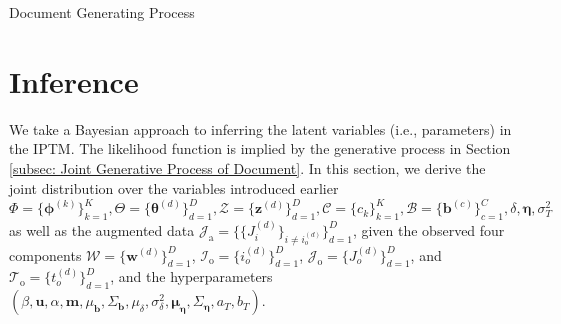 	\begin{algorithm}[H]
		\SetAlgoLined
		\caption{Document Generating Process}
	\label{alg:generative}
	\end{algorithm}

\section{Inference} \label{sec: Inference}		
We take a Bayesian approach to inferring the latent variables (i.e., parameters) in the IPTM. The likelihood function is implied by the generative process in Section \ref{subsec: Joint Generative Process of Document}. In this section, we derive the joint distribution over the variables introduced earlier $\Phi=\{\boldsymbol{\phi}^{(k)}\}_{k=1}^{K}, \Theta=\{\boldsymbol{\theta}^{(d)} \}_{d=1}^{D},\mathcal{Z}=\{\boldsymbol{z}^{(d)} \}_{d=1}^{D}, \mathcal{C}=\{{c}_k \}_{k=1}^{K}, \mathcal{B}=\{\boldsymbol{b}^{(c)} \}_{c=1}^{C}, \delta, \boldsymbol{\eta}, \sigma_T^2$ as well as the augmented data $\mathcal{J}_{\mbox{a}}=\{\{J_i^{(d)}\}_{i\neq i_o^{(d)}}\}_{d=1}^D$, given the observed four components $\mathcal{W}=\{\boldsymbol{w}^{(d)} \}_{d=1}^{D}$, $\mathcal{I}_{\mbox{o}}=\{i_o^{(d)}\}_{d=1}^D$,  $\mathcal{J}_{\mbox{o}}=\{J_o^{(d)}\}_{d=1}^D$, and $\mathcal{T}_{\mbox{o}}= \{t_o^{(d)}\}_{d=1}^D$, and the hyperparameters $(\beta, \boldsymbol{u}, \alpha, \boldsymbol{m}, \mu_{\boldsymbol{b}}, \Sigma_{\boldsymbol{b}}, \mu_\delta, \sigma^2_\delta,  \boldsymbol{\mu}_{\boldsymbol{\eta}}, \Sigma_{\boldsymbol{\eta}}, a_T, b_T)$.
	
